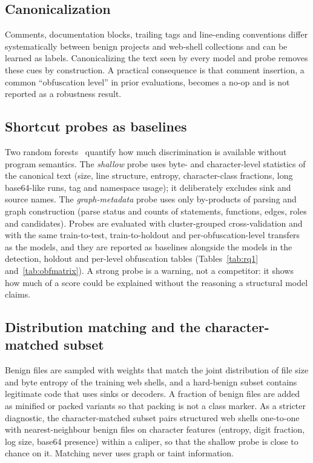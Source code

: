 \documentclass[pdflatex,sn-mathphys-num]{sn-jnl}
\begin{document}
\subsection{Canonicalization}\label{sec:p-canon}
Comments, documentation blocks, trailing tags and line-ending conventions
differ systematically between benign projects and web-shell collections and can
be learned as labels. Canonicalizing the text seen by every model and probe
removes these cues by construction. A practical consequence is that comment
insertion, a common ``obfuscation level'' in prior evaluations, becomes a
no-op and is not reported as a robustness result.

\subsection{Shortcut probes as baselines}\label{sec:p-probe}
Two random forests~\cite{breiman2001rf} quantify how much discrimination is
available without program semantics. The \emph{shallow} probe uses byte- and
character-level statistics of the canonical text (size, line structure,
entropy, character-class fractions, long base64-like runs, tag and namespace
usage); it deliberately excludes sink and source names. The
\emph{graph-metadata} probe uses only by-products of parsing and graph
construction (parse status and counts of statements, functions, edges, roles
and candidates). Probes are evaluated with cluster-grouped cross-validation and
with the same train-to-test, train-to-holdout and per-obfuscation-level
transfers as the models, and they are reported as baselines alongside the
models in the detection, holdout and per-level obfuscation tables
(Tables~\ref{tab:rq1} and~\ref{tab:obfmatrix}).
A strong probe is a warning, not a competitor: it shows how much of a score
could be explained without the reasoning a structural model claims.

\subsection{Distribution matching and the character-matched subset}\label{sec:p-char}
Benign files are sampled with weights that match the joint distribution of file
size and byte entropy of the training web shells, and a hard-benign subset
contains legitimate code that uses sinks or decoders. A fraction of benign
files are added as minified or packed variants so that packing is not a class
marker. As a stricter diagnostic, the character-matched subset pairs structured
web shells one-to-one with nearest-neighbour benign files on character features
(entropy, digit fraction, log size, base64 presence) within a caliper, so that
the shallow probe is close to chance on it. Matching never uses graph or taint
information.
\end{document}

